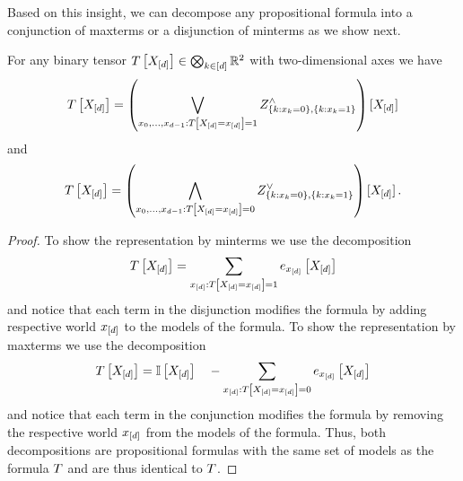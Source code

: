 Based on this insight, we can decompose any propositional formula into a conjunction of maxterms or a disjunction of minterms as we show next.

\begin{theorem}\label{the:tensorToMaxMinTerms}
	For any binary tensor $T\left[X_{[d]}\right]\in\bigotimes_{k\in[d]}\mathbb{R}^2$ with two-dimensional axes we have
	\begin{align*}
		T\left[X_{[d]}\right] = \left( \bigvee_{x_{0},\ldots,x_{d-1} : T\left[X_{[d]}=x_{[d]}\right]=1} 
		Z^{\land}_{
		\{k : x_{k}=0\}
		,
		\{k: x_{k}=1\}
		} 
		\right)
		[X_{[d]}] 
	\end{align*}
	and
	\begin{align*}
		T\left[X_{[d]}\right] = \left( \bigwedge_{x_{0},\ldots,x_{d-1} : T\left[X_{[d]}=x_{[d]}\right]=0} 
		Z^{\lor}_{
		\{k : x_{k}=0\}
		,
		\{k: x_{k}=1\}
		} 
		\right)
		[X_{[d]}] \, .
	\end{align*}
\end{theorem}
\begin{proof}
	To show the representation by minterms we use the decomposition
	\begin{align*}
		T\left[X_{[d]}\right]  = \sum_{x_{[d]} : T\left[X_{[d]}=x_{[d]}\right] = 1} e_{x_{[d]}}\left[X_{[d]}\right]
	\end{align*}
	and notice that each term in the disjunction modifies the formula by adding respective world $x_{[d]}$ to the models of the formula.
	To show the representation by maxterms we use the decomposition
	\begin{align*}
		T\left[X_{[d]}\right]  = \mathbb{I}\left[X_{[d]}\right] \quad - \sum_{x_{[d]} : T\left[X_{[d]}=x_{[d]}\right] = 0} e_{x_{[d]}}\left[X_{[d]}\right]
	\end{align*}
	and notice that each term in the conjunction modifies the formula by removing the respective world $x_{[d]}$ from the models of the formula.	
	Thus, both decompositions are propositional formulas with the same set of models as the formula $T$ and are thus identical to $T$.
\end{proof}


